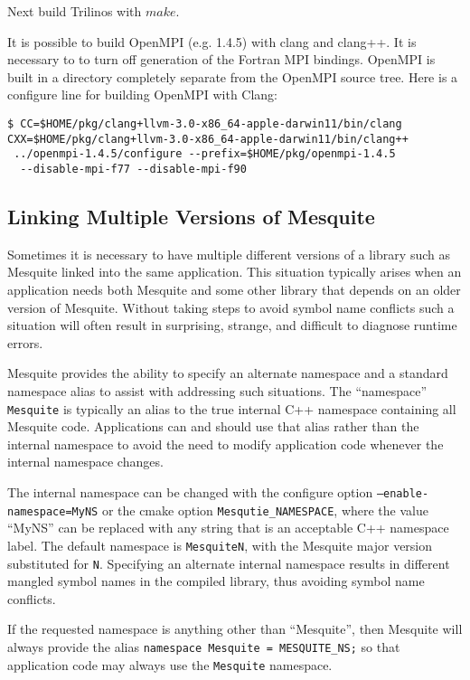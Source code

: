 Next build Trilinos with $make$.

It is possible to build OpenMPI (e.g. 1.4.5) with clang and clang++.  It is necessary to to turn off generation of the Fortran MPI bindings.  
OpenMPI is built in a directory completely separate from the OpenMPI source tree.
 Here is a configure line for building OpenMPI with Clang:
 \begin{verbatim}
$ CC=$HOME/pkg/clang+llvm-3.0-x86_64-apple-darwin11/bin/clang 
CXX=$HOME/pkg/clang+llvm-3.0-x86_64-apple-darwin11/bin/clang++
 ../openmpi-1.4.5/configure --prefix=$HOME/pkg/openmpi-1.4.5
  --disable-mpi-f77 --disable-mpi-f90
\end{verbatim}

\subsection{Linking Multiple Versions of Mesquite \label{namespace_mangling} }

Sometimes it is necessary to have multiple different versions of a library 
such as Mesquite linked into the same application.  This situation typically
arises when an application needs both Mesquite and some other library that depends on an older version of Mesquite.  Without taking steps to avoid symbol
name conflicts such a situation will often result in surprising, strange, and
difficult to diagnose runtime errors.  

Mesquite provides the ability to specify an alternate namespace and a standard
namespace alias to assist with addressing such situations.  The ``namespace'' \texttt{Mesquite} is typically an alias to the true internal C++ namespace containing all Mesquite code.  Applications can and should use that alias rather than the internal namespace to avoid the need to modify application code whenever the internal namespace changes.  

The internal namespace can be changed with the configure option \texttt{--enable-namespace=MyNS} or the cmake option \texttt{Mesqutie\_NAMESPACE}, where the value ``MyNS'' can be replaced with any string that is an acceptable C++ namespace label.  The default namespace is \texttt{MesquiteN}, with the Mesquite major version substituted for \texttt{N}.  Specifying an alternate internal namespace results in different mangled symbol names in the compiled library, thus avoiding symbol name conflicts.

If the requested namespace is anything other than ``Mesquite'', then Mesquite will always provide the alias \texttt{namespace Mesquite = MESQUITE\_NS;} so that application code may always use the \texttt{Mesquite} namespace.



